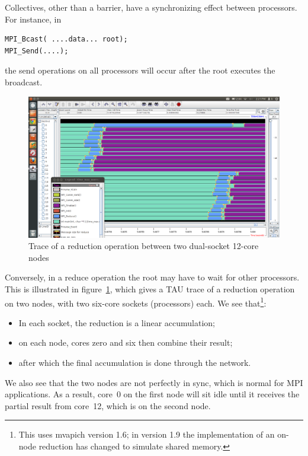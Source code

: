 Collectives, other than a barrier, have a synchronizing effect between processors.
For instance, in
\begin{lstlisting}
MPI_Bcast( ....data... root);
MPI_Send(....);
\end{lstlisting}
the send operations on all processors will occur after the root executes
the broadcast. 
\begin{figure}[ht]
  \includegraphics[scale=.35]{graphics/reduce-two-node}
  \caption{Trace of a reduction operation between two dual-socket 12-core nodes}
  \label{fig:trace-reduce}
\end{figure}
Conversely, in a reduce operation the root may have to wait for 
other processors. This is illustrated in figure~\ref{fig:trace-reduce}, which 
gives a TAU trace of
a reduction operation on two nodes, with two six-core sockets (processors) each.
We see that\footnote
{This uses mvapich version 1.6; in version 1.9 the implementation of an on-node reduction
has changed to simulate shared memory.}:
\begin{itemize}
\item In each socket, the reduction is a linear accumulation;
\item on each node, cores zero and six then combine their result;
\item after which the final accumulation is done through the network.
\end{itemize}
We also see that the two nodes are not perfectly in sync, which is normal for MPI
applications. As a result, core~0 on the first node will sit idle until it receives the partial
result from core~12, which is on the second node.

